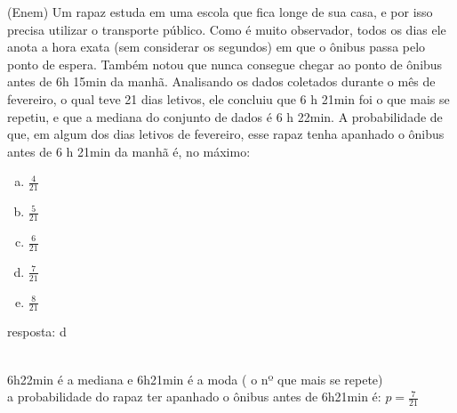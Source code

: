 \begin{ex}
 (Enem) Um rapaz estuda em uma escola que fica longe de sua casa, e por isso precisa utilizar o transporte público. Como é muito observador, todos os dias ele anota a hora exata (sem considerar os segundos) em que o ônibus passa pelo ponto de espera. Também notou que nunca consegue chegar ao ponto de ônibus antes de 6h 15min da manhã. Analisando os dados coletados durante o mês de fevereiro, o  qual teve 21 dias letivos, ele concluiu que 6 h 21min foi o que mais se repetiu, e que a mediana do conjunto de dados é 6 h 22min.
 A probabilidade de que, em algum dos dias letivos de fevereiro, esse rapaz tenha apanhado o ônibus antes de 6 h 21min da manhã é, no máximo:
    \begin{enumerate} [(a)]
        \item $\frac{4}{21}$
        \item $\frac{5}{21}$
        \item $\frac{6}{21}$
        \item $\frac{7}{21}$
        \item $\frac{8}{21}$
    \end{enumerate}
      \begin{sol}
      resposta: d \\
      \\
      6h22min é a mediana e 6h21min é a moda ( o nº que mais se repete)\\
      a probabilidade do rapaz ter apanhado o ônibus antes de 6h21min é:\hspace{0,3cm}  $p=\frac{7}{21}$ 
      \end{sol}
 \end{ex}